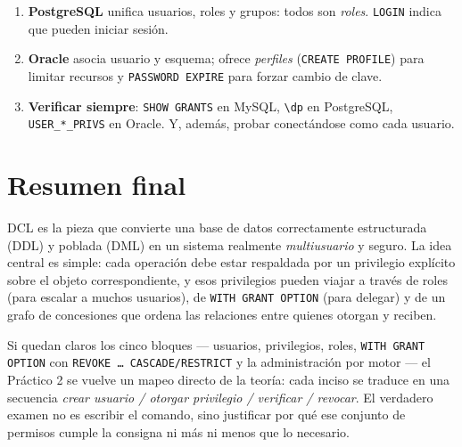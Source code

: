 \documentclass[11pt,a4paper]{article}
\begin{document}
\begin{enumerate}
    \texttt{MAX\_CONNECTIONS\_PER\_HOUR}, etc.
    \item \textbf{PostgreSQL} unifica usuarios, roles y grupos: todos
    son \emph{roles}. \texttt{LOGIN} indica que pueden iniciar sesión.
    \item \textbf{Oracle} asocia usuario y esquema; ofrece
    \emph{perfiles} (\texttt{CREATE PROFILE}) para limitar recursos
    y \texttt{PASSWORD EXPIRE} para forzar cambio de clave.
    \item \textbf{Verificar siempre}: \texttt{SHOW GRANTS} en MySQL,
    \texttt{\textbackslash dp} en PostgreSQL, \texttt{USER\_*\_PRIVS}
    en Oracle. Y, además, probar conectándose como cada usuario.
\end{enumerate}

\section*{Resumen final}

DCL es la pieza que convierte una base de datos correctamente
estructurada (DDL) y poblada (DML) en un sistema realmente
\emph{multiusuario} y seguro. La idea central es simple: cada
operación debe estar respaldada por un privilegio explícito sobre el
objeto correspondiente, y esos privilegios pueden viajar a través de
roles (para escalar a muchos usuarios), de \texttt{WITH GRANT OPTION}
(para delegar) y de un grafo de concesiones que ordena las relaciones
entre quienes otorgan y reciben.

Si quedan claros los cinco bloques --- usuarios, privilegios, roles,
\texttt{WITH GRANT OPTION} con \texttt{REVOKE \dots\ CASCADE/RESTRICT}
y la administración por motor --- el Práctico 2 se vuelve un mapeo
directo de la teoría: cada inciso se traduce en una secuencia
\emph{crear usuario / otorgar privilegio / verificar / revocar}. El
verdadero examen no es escribir el comando, sino justificar por qué
ese conjunto de permisos cumple la consigna ni más ni menos que lo
necesario.
\end{document}
